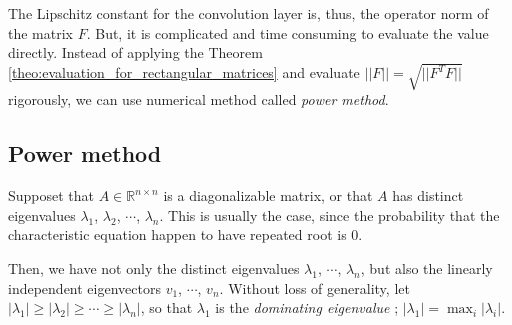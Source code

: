 \documentclass[12pt]{report}
\numberwithin{figure}{chapter}
\theoremstyle{plain}
\theoremstyle{definition}
\theoremstyle{corollary}
\theoremstyle{definition}
\theoremstyle{plain}
\theoremstyle{definition}
\theoremstyle{plain}
\begin{document}
The Lipschitz constant for the convolution layer is, thus, the operator norm of the matrix \(F\).
But, it is complicated and time consuming to evaluate the value directly.
Instead of applying the Theorem \ref{theo:evaluation_for_rectangular_matrices} and evaluate \(||F||=\sqrt{||F^TF||}\) rigorously, we can use numerical method called \emph{power method}.

\subsection{Power method}\label{sec:power_method}
Supposet that \(A\in\mathbb R^{n\times n}\) is a diagonalizable matrix, or that \(A\) has distinct eigenvalues \(\lambda_1\), \(\lambda_2\), \(\cdots\), \(\lambda_n\).
This is usually the case, since the probability that the characteristic equation happen to have repeated root is 0.

Then, we have not only the distinct eigenvalues \(\lambda_1\), \(\cdots\), \(\lambda_n\), but also the linearly independent eigenvectors \(v_1\), \(\cdots\), \(v_n\).
Without loss of generality, let \(|\lambda_1|\ge|\lambda_2|\ge\cdots\ge|\lambda_n|\), so that \(\lambda_1\) is the \emph{dominating eigenvalue} ; \(|\lambda_1|=\max_i|\lambda_i|\).
\end{document}
